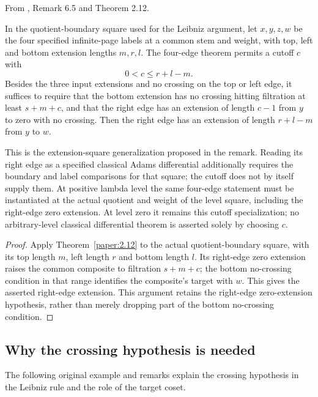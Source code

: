 \begin{remark}
\label{paper:6.5}
From \cite{LWX126}, Remark 6.5 and Theorem 2.12.\par
In the quotient-boundary square used for the Leibniz argument, let $x,y,z,w$ be the four specified infinite-page labels at a common stem and weight, with top, left and bottom extension lengths $m,r,l$. The four-edge theorem permits a cutoff $c$ with
\[
0<c\le r+l-m.
\]
Besides the three input extensions and no crossing on the top or left edge, it suffices to require that the bottom extension has no crossing hitting filtration at least $s+m+c$, and that the right edge has an extension of length $c-1$ from $y$ to zero with no crossing. Then the right edge has an extension of length $r+l-m$ from $y$ to $w$.

This is the extension-square generalization proposed in the remark. Reading its right edge as a specified classical Adams differential additionally requires the boundary and label comparisons for that square; the cutoff does not by itself supply them. At positive lambda level the
same four-edge statement must be instantiated at the actual quotient
and weight of the level square, including the right-edge zero extension.
At level zero it remains this cutoff specialization; no arbitrary-level
classical differential theorem is asserted solely by choosing $c$.
\end{remark}
\begin{proof}
Apply Theorem~\ref{paper:2.12} to the actual quotient-boundary square, with its top length $m$, left length $r$ and bottom length $l$. Its right-edge zero extension raises the common composite to filtration $s+m+c$; the bottom no-crossing condition in that range identifies the composite's target with $w$. This gives the asserted right-edge extension. This argument retains the right-edge zero-extension hypothesis, rather than merely dropping part of the bottom no-crossing condition.
\end{proof}

\subsection{Why the crossing hypothesis is needed}

The following original example and remarks explain the crossing
hypothesis in the Leibniz rule and the role of the target coset.

